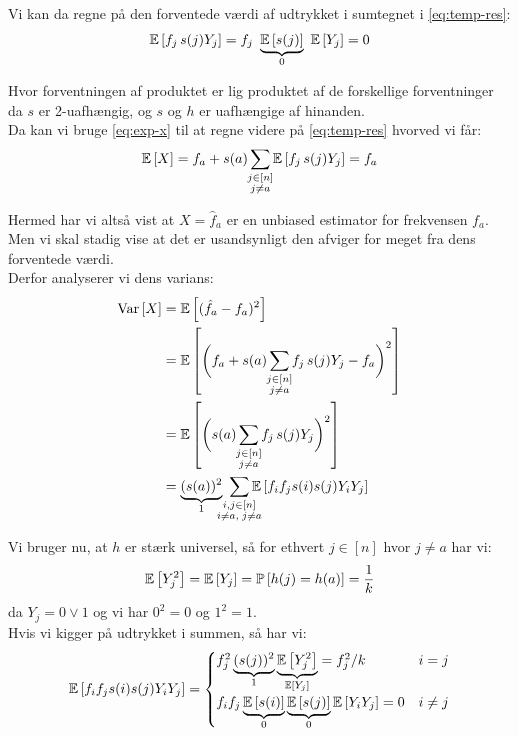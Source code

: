 Vi kan da regne på den forventede værdi af udtrykket i sumtegnet i \cref{eq:temp-res}:
\begin{align}
  \mathbb{E} \left[  f_j \, s(j) Y_j  \right]
  = f_j \ \underbrace{\mathbb{E} \left[  s(j)  \right]}_{0} \ \mathbb{E} \left[  Y_j  \right]
  = 0 \label{eq:exp-x}
\end{align}

Hvor forventningen af produktet er lig produktet af de forskellige forventninger da $s$ er 2-uafhængig, og $s$ og $h$ er uafhængige af hinanden.\\

Da kan vi bruge \cref{eq:exp-x} til at regne videre på \cref{eq:temp-res} hvorved vi får:
\begin{align}
  \E{X}
  = f_a + s(a) \summ{j \in [n]\\ j \neq a} \E{f_j \, s(j) Y_j}
  = f_a
\end{align}

Hermed har vi altså vist at $X = \hat f_a$ er en unbiased estimator for frekvensen $f_a$. Men vi skal stadig vise at det er usandsynligt den afviger for meget fra dens forventede værdi.\\


Derfor analyserer vi dens varians:
\begin{align*}
  \Var{X}
  &= \E{(\hat f_a - f_a)^2}\\
  &= \E{\pbigg{ f_a + s(a) \summ{j \in [n]\\ j \neq a} f_j \, s(j) Y_j - f_a}^2 }\\
  &= \E{\pbigg{ s(a) \summ{j \in [n]\\ j \neq a} f_j \, s(j) Y_j }^2 }\\
  &= \underbrace{(s(a))^2}_{1} \ \summ{i, j \in [n]\\i \neq a, \; j \neq a} \E{ f_i f_j s(i) s(j) Y_i Y_j }
\end{align*}

Vi bruger nu, at $h$ er stærk universel, så for ethvert $j \in [n]$ hvor $j \neq a$ har vi:
$$
\mathbb{E} \left[  Y_j^2  \right] = \mathbb{E} \left[  Y_j  \right] = \mathbb{P} \left[  h(j) = h(a)  \right] = \frac{1}{k}
$$
da $Y_j = 0 \lor 1$ og vi har $0^2 = 0$ og $1^2 = 1$.\\

Hvis vi kigger på udtrykket i summen, så har vi:
$$
\mathbb{E} \left[   f_i f_j s(i) s(j) Y_i Y_j   \right] =
\begin{cases}
	f_j^2 \underbrace{(s(j))^2}_{1} \underbrace{\mathbb{E} \left[  Y_j^2  \right]}_{\mathbb{E} \left[  Y_j  \right]} = f_j^2 / k & i = j\\
  f_i f_j \underbrace{\mathbb{E} \left[  s(i)  \right]}_{0} \underbrace{\mathbb{E} \left[  s(j)  \right]}_{0} \mathbb{E} \left[  Y_i Y_j  \right] = 0 & i \neq j
\end{cases}
$$

